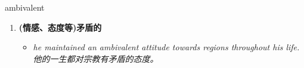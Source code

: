 
\begin{frame}
{\huge ambivalent}
\begin{center}
\begin{enumerate}\Large
  \item \textbf{(情感、态度等)矛盾的}
  \begin{itemize}
    \item \em{\Large{he maintained an ambivalent attitude towards regions throughout his life. 他的一生都对宗教有矛盾的态度。}}
  \end{itemize}
\end{enumerate}
\end{center}
\end{frame}
